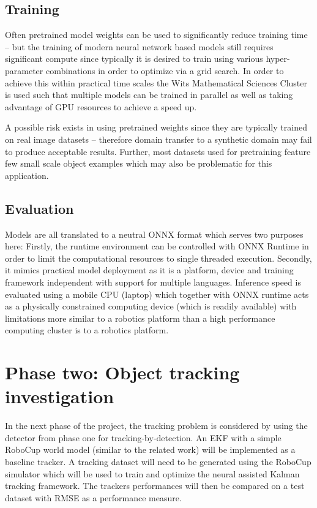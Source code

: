 \documentclass[a4paper,twoside,12pt]{report}
\begin{document}
\subsection{Training}

Often pretrained model weights can be used to significantly reduce training time -- but the training of modern neural network based models still requires significant compute since typically it is desired to train using various hyper-parameter combinations in order to optimize via a grid search. In order to achieve this within practical time scales the Wits Mathematical Sciences Cluster is used such that multiple models can be trained in parallel as well as taking advantage of GPU resources to achieve a speed up.  

A possible risk exists in using pretrained weights since they are typically trained on real image datasets -- therefore domain transfer to a synthetic domain may fail to produce acceptable results. Further, most datasets used for pretraining feature few small scale object examples which may also be problematic for this application.

\subsection{Evaluation}

Models are all translated to a neutral ONNX format which serves two purposes here: Firstly, the runtime environment can be controlled with ONNX Runtime in order to limit the computational resources to single threaded execution. Secondly, it mimics practical model deployment as it is a platform, device and training framework independent with support for multiple languages. Inference speed is evaluated using a mobile CPU (laptop) which together with ONNX runtime acts as a physically constrained computing device (which is readily available) with limitations more similar to a robotics platform than a high performance computing cluster is to a robotics platform.


\section{Phase two: Object tracking investigation}

In the next phase of the project, the tracking problem is considered by using the detector from phase one for tracking-by-detection. An EKF with a simple RoboCup world model (similar to the related work) will be implemented as a baseline tracker. A tracking dataset will need to be generated using the RoboCup simulator which will be used to train and optimize the neural assisted Kalman tracking framework. The trackers performances will then be compared on a test dataset with RMSE as a performance measure.
\end{document}
